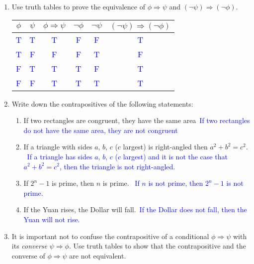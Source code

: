 \documentclass[13.5pt]{article}
\begin{document}
\begin{enumerate}
\item{Use truth tables to prove the equivalence of \(\phi \Rightarrow \psi\) and  \((\neg\psi) \Rightarrow (\neg\phi)\). }
\begin{center}
\begin{tabular}{c c c c c c}
 \(\phi\) & \(\psi\) & \(\phi \Rightarrow \psi\) & \(\neg\phi\) &\(\neg\psi\) & \((\neg\psi) \Rightarrow (\neg\phi)\) \\
\hline
 \textcolor{blue}{T} & \textcolor{blue}{T} & \textcolor{blue}{T} & \textcolor{blue}{F} & \textcolor{blue}{F} & \textcolor{blue}{T} \\ 
 \textcolor{blue}{T} & \textcolor{blue}{F} & \textcolor{blue}{F} & \textcolor{blue}{F} & \textcolor{blue}{T} & \textcolor{blue}{F}\\ 
 \textcolor{blue}{F} & \textcolor{blue}{T} & \textcolor{blue}{T} & \textcolor{blue}{T} & \textcolor{blue}{F} & \textcolor{blue}{T}\\ 
 \textcolor{blue}{F} & \textcolor{blue}{F} & \textcolor{blue}{T} & \textcolor{blue}{T} & \textcolor{blue}{T} & \textcolor{blue}{T}\\ 
\end{tabular}
\end{center}

\item{Write down the contrapositives of the following statements:}

\begin{enumerate}
\setlength{\itemindent}{.1in}
\item{If two rectangles are congruent, they have the same area}\
\textcolor{blue} {If two rectangles do not have the same area, they are not congruent}
\item{If a triangle with sides \(a\), \(b\), \(c\) (\(c\) largest) is right-angled then \(a^2 + b^2 = c^2. \)}\
\textcolor{blue} {If a triangle has sides \(a\), \(b\), \(c\) (\(c\) largest) and it is not the case that \(a^2 + b^2 = c^2\), then the triangle is not right-angled.}
\item{If \(2^n-1\) is prime, then \(n\) is prime. }\
\textcolor{blue} {If \(n\) is not prime, then \(2^n-1\) is not prime.}
\item{If the Yuan rises, the Dollar will fall.}\
\textcolor{blue} {If the Dollar does not fall, then the Yuan will not rise.}

\end{enumerate}

\item{It is important not to confuse the contrapositive of a conditional  \(\phi \Rightarrow \psi\) with its \textit{converse} \(\psi \Rightarrow \phi\). Use truth tables to show that the contrapositive and the converse of \(\phi \Rightarrow \psi\) are not equivalent. }


\end{enumerate}
\end{document}
